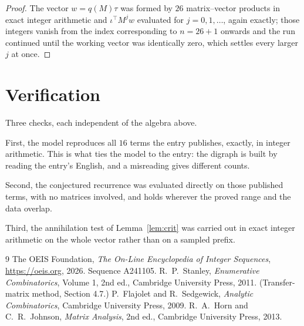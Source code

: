 \documentclass[11pt,a4paper]{article}
\theoremstyle{plain}
\theoremstyle{definition}
\begin{document}
\begin{proof}
The vector $w=q(M)\tau$ was formed by $26$ matrix--vector products in exact integer
arithmetic and $\iota^{\!\top}M^{j}w$ evaluated for $j=0,1,\dots$, again exactly; those
integers vanish from the index corresponding to $n=26+1$ onwards and the run continued
until the working vector was identically zero, which settles every larger $j$ at once.
\end{proof}

\section{Verification}

Three checks, each independent of the algebra above.

First, the model reproduces all $16$ terms the entry publishes, exactly, in integer
arithmetic. This is what ties the model to the entry: the digraph is built by reading the
entry's English, and a misreading gives different counts.

Second, the conjectured recurrence was evaluated directly on those published terms, with no
matrices involved, and holds wherever the proved range and the data overlap.

Third, the annihilation test of Lemma~\ref{lem:crit} was carried out in exact integer
arithmetic on the whole vector rather than on a sampled prefix.

\begin{thebibliography}{9}
 The OEIS Foundation, \emph{The On-Line Encyclopedia of Integer
Sequences}, \url{https://oeis.org}, 2026. Sequence A241105.
 R.~P.~Stanley, \emph{Enumerative Combinatorics}, Volume 1, 2nd ed.,
Cambridge University Press, 2011. (Transfer-matrix method, Section 4.7.)
 P.~Flajolet and R.~Sedgewick, \emph{Analytic Combinatorics}, Cambridge
University Press, 2009.
 R.~A.~Horn and C.~R.~Johnson, \emph{Matrix Analysis}, 2nd ed., Cambridge
University Press, 2013.
\end{thebibliography}
\end{document}
